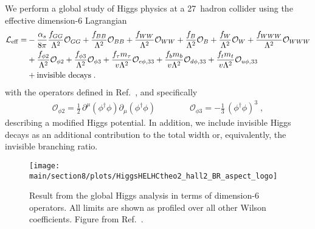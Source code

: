 We perform a global study of Higgs physics at a 27~\UTeV hadron collider
using the effective dimension-6 Lagrangian~\cite{Brivio:2017vri} 
\begin{align}
\mathcal{L}_\text{eff} 
= & - \frac{\alpha_s }{8 \pi} \frac{f_{GG}}{\Lambda^2} \mathcal{O}_{GG}  
    + \frac{f_{BB}}{\Lambda^2} \mathcal{O}_{BB} 
    + \frac{f_{WW}}{\Lambda^2} \mathcal{O}_{WW} 
    + \frac{f_B}{\Lambda^2} \mathcal{O}_B 
    + \frac{f_W}{\Lambda^2} \mathcal{O}_W 
    + \frac{f_{WWW}}{\Lambda^2} \mathcal{O}_{WWW} \notag \\ 
  &  + \frac{f_{\phi 2}}{\Lambda^2} \mathcal{O}_{\phi 2} 
    + \frac{f_{\phi 3}}{\Lambda^2} \mathcal{O}_{\phi 3} 
    + \frac{f_\tau m_\tau}{v \Lambda^2} \mathcal{O}_{e\phi,33} 
    + \frac{f_b m_b}{v \Lambda^2} \mathcal{O}_{d\phi,33} 
    + \frac{f_t m_t}{v \Lambda^2} \mathcal{O}_{u\phi,33} \notag \\
  & + \text{invisible decays} \; .
\label{eq:ourleff}
\end{align}
%
with the operators defined in Ref.~\cite{Butter:2016cvz}, 
and specifically
%
\begin{align}
\mathcal{O}_{\phi 2} = \frac{1}{2} \, \partial^\mu (\phi^\dagger \phi) \partial_\mu (\phi^\dagger \phi)  
\qquad \qquad
\mathcal{O}_{\phi 3} = -\frac{1}{3} \, (\phi^\dagger \phi)^3 \; ,
\label{eq:ope23}
\end{align}
%
describing a modified Higgs potential. In addition, we include invisible 
Higgs decays as an additional contribution to the total width or, equivalently, 
the invisible branching ratio.
\begin{figure}[b!]
\centering
\texttt{[image: \\main/section8/plots/HiggsHELHCtheo2\_hall2\_BR\_aspect\_logo]}
\caption{Result from the global Higgs analysis in terms of dimension-6
  operators. All limits are shown as profiled over all other Wilson
  coefficients. Figure from Ref.~\cite{Biekotter:2018jzu}.}
\label{fig:d6}
\end{figure}

